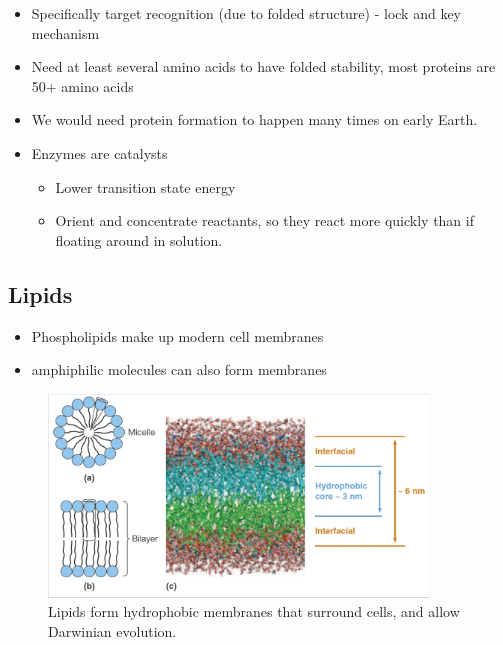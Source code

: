 \documentclass[]{article}
\begin{document}
\begin{itemize}
	\item  Specifically target recognition (due to folded
	structure) - lock and key mechanism
	\item  Need at least several amino acids to have
	folded stability, most proteins are 50+ amino
	acids
	\item We would need protein formation to happen many times on early Earth.
	\item Enzymes are catalysts
	\begin{itemize}
		\item Lower transition state energy
		\item Orient and concentrate reactants, so they react more quickly than if floating around in solution.
	\end{itemize}
\end{itemize}



\subsection{Lipids}
\cite[14.2 Lipids \& Triglycerides]{brown2009chemistry}

\begin{itemize}
	\item Phospholipids make up modern cell
	membranes
	\item amphiphilic molecules can also form
	membranes
\end{itemize}

\begin{figure}[H]
	\caption[How lipids  allow Darwinian evolution.]{Lipids form hydrophobic membranes that surround cells, and allow Darwinian evolution.}\label{fig:Lipids} 
	\includegraphics[width=0.9\textwidth]{Lipids}
\end{figure}
\end{document}
